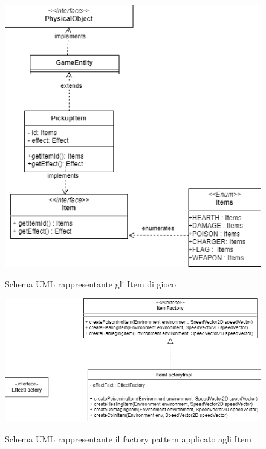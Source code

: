 \begin{figure}[H]
	\centering{}
	\includegraphics[width=\textwidth]{img/item}
	\label{img:item.png}
	\caption{Schema UML rappresentante gli Item di gioco\\}
\end{figure}

\begin{figure}[H]
	\centering{}
	\includegraphics[width=\textwidth]{img/ItemFactory}
	\label{img:ItemFactory.png}
	\caption{Schema UML rappresentante il factory pattern applicato agli Item\\}
\end{figure}

\newpage


